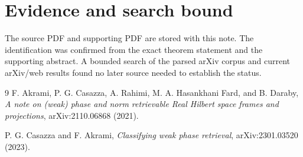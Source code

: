 \documentclass[11pt]{article}
\begin{document}
\section*{Evidence and search bound}

The source PDF and supporting PDF are stored with this note.  The identification
was confirmed from the exact theorem statement and the supporting abstract.
A bounded search of the parsed arXiv corpus and current arXiv/web results found
no later source needed to establish the status.

\begin{thebibliography}{9}
F. Akrami, P. G. Casazza, A. Rahimi, M. A. Hasankhani Fard, and B. Daraby,
\emph{A note on (weak) phase and norm retrievable Real Hilbert space frames
and projections}, arXiv:2110.06868 (2021).

P. G. Casazza and F. Akrami,
\emph{Classifying weak phase retrieval}, arXiv:2301.03520 (2023).
\end{thebibliography}
\end{document}
